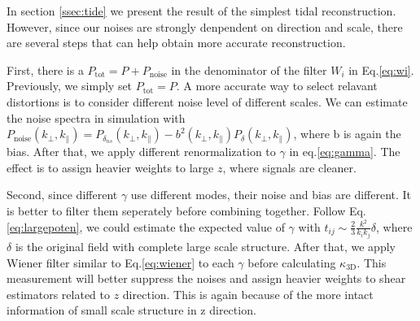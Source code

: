\label{ssec:improve}
In section \ref{ssec:tide} we present the result of the simplest tidal reconstruction. 
However, since our noises are strongly denpendent on direction and scale, 
there are several steps that can help obtain more accurate reconstruction.

First, there is a $P_{\mathrm{tot}}=P+P_\mathrm{noise}$ 
in the denominator of the filter $W_i$ in Eq.\ref{eq:wi}. 
Previously, we simply set $P_\mathrm{tot}=P$. 
A more accurate way to select relavant distortions is to consider different noise level of different scales. 
We can estimate the noise spectra in simulation with  
$P_\mathrm{noise}(k_\perp,k_\parallel)=P_{\delta_{ns}}(k_\perp,k_\parallel)-b^2(k_\perp,k_\parallel)P_\delta(k_\perp,k_\parallel)$, where b is again the bias. 
After that, we apply different renormalization to $\gamma$ in 
eq.\ref{eq:gamma}. 
The effect is to assign heavier weights to large $z$, where signals are cleaner.

Second, since different $\gamma$ use different modes, 
their noise and bias are different. 
It is better to filter them seperately before combining together. 
Follow Eq.\ref{eq:largepoten}, we could estimate the expected value of $\gamma$ 
with 
$t_{ij}\sim \frac{2}{3}\frac{k^2}{k_ik_j}\delta$, 
where $\delta$ is the original field with complete large scale structure. 
After that, we apply Wiener filter similar to Eq.\ref{eq:wiener} 
to each $\gamma$ before calculating $\kappa_\mathrm{3D}$. 
This measurement will better suppress the noises and assign heavier weights to 
shear estimators related to $z$ direction. 
This is again because of the more intact information of small scale structure in z direction.

